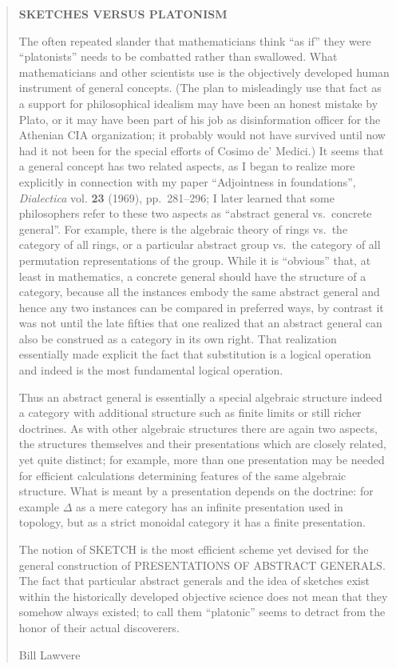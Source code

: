 \documentclass{article}
\begin{document}
\begin{quote}
\textbf{SKETCHES VERSUS PLATONISM}

The often repeated slander that mathematicians think ``as if'' they were
``platonists'' needs to be combatted rather than swallowed. What
mathematicians and other scientists use is the objectively developed
human instrument of general concepts. (The plan to misleadingly use that
fact as a support for philosophical idealism may have been an honest
mistake by Plato, or it may have been part of his job as disinformation
officer for the Athenian CIA organization; it probably would not have
survived until now had it not been for the special efforts of Cosimo de'
Medici.) It seems that a general concept has two related aspects, as I
began to realize more explicitly in connection with my paper
``Adjointness in foundations'', \emph{Dialectica} vol. \textbf{23}
(1969), pp.~281--296; I later learned that some philosophers refer to
these two aspects as ``abstract general vs.~concrete general''. For
example, there is the algebraic theory of rings vs.~the category of all
rings, or a particular abstract group vs.~the category of all
permutation representations of the group. While it is ``obvious'' that,
at least in mathematics, a concrete general should have the structure of
a category, because all the instances embody the same abstract general
and hence any two instances can be compared in preferred ways, by
contrast it was not until the late fifties that one realized that an
abstract general can also be construed as a category in its own right.
That realization essentially made explicit the fact that substitution is
a logical operation and indeed is the most fundamental logical
operation.

Thus an abstract general is essentially a special algebraic structure
indeed a category with additional structure such as finite limits or
still richer doctrines. As with other algebraic structures there are
again two aspects, the structures themselves and their presentations
which are closely related, yet quite distinct; for example, more than
one presentation may be needed for efficient calculations determining
features of the same algebraic structure. What is meant by a
presentation depends on the doctrine: for example \(\Delta\) as a mere
category has an infinite presentation used in topology, but as a strict
monoidal category it has a finite presentation.

The notion of SKETCH is the most efficient scheme yet devised for the
general construction of PRESENTATIONS OF ABSTRACT GENERALS. The fact
that particular abstract generals and the idea of sketches exist within
the historically developed objective science does not mean that they
somehow always existed; to call them ``platonic'' seems to detract from
the honor of their actual discoverers.

Bill Lawvere
\end{quote}
\end{document}

